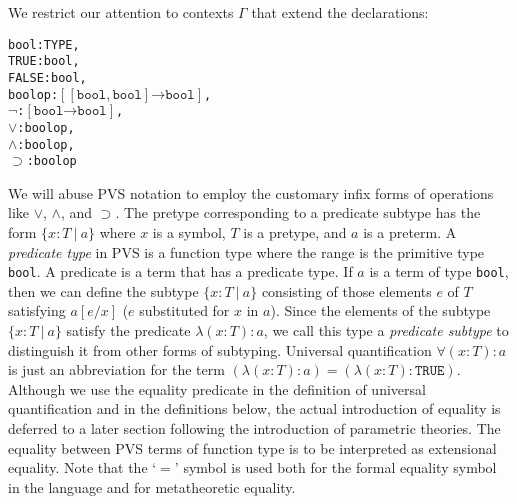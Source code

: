 \documentclass [12pt,twoside]{cslreport}
\newcommand{\aro}{\mathord\rightarrow} %
\newcommand{\funtype}[2]{[#1 \aro #2]}
\newcommand{\tupletype}[1]{[#1]}
\newcommand{\proj}[1]{\mathtt{p}_{#1}}
\newcommand{\ttbool}{\mathtt{bool}}
\newcommand{\vbar}{\ |\ }
\begin{document}
We restrict our attention to contexts $\Gamma$ that extend
the declarations:
\begin{alltt}
 bool : TYPE,
 TRUE : bool,
 FALSE : bool,
 boolop : \(\funtype{\tupletype{\ttbool, \ttbool}}{\ttbool}\),
 \(\neg\) : \(\funtype{\ttbool}{\ttbool}\),
 \(\vee\) : boolop,
 \(\wedge\) : boolop,
 \(\supset\) : boolop
\end{alltt}
We will abuse PVS notation to employ the customary infix forms of
operations like $\vee$, 
$\wedge$, and $\supset$.    The pretype corresponding to a predicate
subtype has the form $\{x : T \vbar a\}$ where $x$ is a symbol, $T$ is a
pretype, and $a$ is a preterm.   
A \emph{predicate type} in PVS is a function type where the range is the
primitive type \texttt{bool}.  A predicate is a term that has a predicate
type.  If $a$ is a term of type \texttt{bool}, then 
we can define the subtype $\{ x : T \vbar a\}$ consisting of those
elements $e$ of $T$ satisfying $a[e/x]$ ($e$ substituted for $x$ in $a$).
Since the elements of the subtype $\{ x : T \vbar a\}$ satisfy the predicate $
\lambda (x  : T): a$, 
we call this type a {\em predicate subtype\/} to distinguish it from other
forms of subtyping.  
Universal quantification $\forall (x : T): a$ is just an abbreviation
for the term $(\lambda (x : T): a) = (\lambda (x : T): \mathtt{TRUE})$\@.  
Although we use the equality  predicate in the definition of universal
quantification and in the definitions below, the actual introduction of
equality is deferred to a later section following the introduction of
parametric theories.  The equality between PVS terms of function type
is to be interpreted as extensional equality.  Note that the `$=$' symbol is
used both for the formal equality symbol in the language and for
metatheoretic equality.   
\begin{comment}
We will also use the notation $\lambda (x_1 : T_1, \ldots, x_n : T_n): a$
in place of $\lambda (x : \tupletype{\seq{T}{n}}): a[
\proj{1}(x)/x_1, \ldots, \mathtt{PROJ\_n}(x)/x_n]$\@.
\end{comment}
\end{document}
